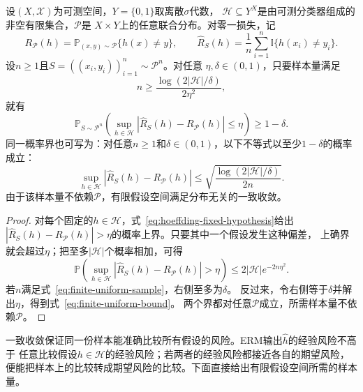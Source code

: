 \begin{theorem}[有限假设空间的一致收敛样本量界]
\label{thm:finite-uniform-convergence}
设$(X,\mathcal X)$为可测空间，$Y=\{0,1\}$取离散$\sigma$代数，
$\mathcal H\subseteq Y^X$是由可测分类器组成的非空有限集合，$\mathcal P$是
$X\times Y$上的任意联合分布。对零一损失，记
\[
 R_{\mathcal P}(h)=\mathbb P_{(x,y)\sim\mathcal P}\{h(x)\neq y\},\qquad
 \hat R_S(h)=\frac1n\sum_{i=1}^n\mathbb I\{h(x_i)\neq y_i\}.
\]
设$n\geq1$且$S=((x_i,y_i))_{i=1}^n\sim\mathcal P^n$。对任意
$\eta,\delta\in(0,1)$，只要样本量满足
\begin{equation}
 n\geq\frac{\log(2|\mathcal H|/\delta)}{2\eta^2},
 \label{eq:finite-uniform-sample}
\end{equation}
就有
\[
 \mathbb P_{S\sim\mathcal P^n}\left(
 \sup_{h\in\mathcal H}|\hat R_S(h)-R_{\mathcal P}(h)|\leq\eta
 \right)\geq1-\delta.
\]
同一概率界也可写为：对任意$n\geq1$和$\delta\in(0,1)$，以下不等式以至少$1-\delta$的概率成立：
\begin{equation}
 \sup_{h\in\mathcal H}|\hat R_S(h)-R_{\mathcal P}(h)|
 \leq\sqrt{\frac{\log(2|\mathcal H|/\delta)}{2n}}.
 \label{eq:finite-uniform-bound}
\end{equation}
由于该样本量不依赖$\mathcal P$，有限假设空间满足分布无关的一致收敛。
\end{theorem}

\begin{proof}
对每个固定的$h\in\mathcal H$，式~\eqref{eq:hoeffding-fixed-hypothesis}给出
$|\hat R_S(h)-R_{\mathcal P}(h)|>\eta$的概率上界。只要其中一个假设发生这种偏差，
上确界就会超过$\eta$；把至多$|\mathcal H|$个概率相加，可得
\[
 \mathbb P\left(\sup_{h\in\mathcal H}|\hat R_S(h)-R_{\mathcal P}(h)|>\eta\right)
 \leq 2|\mathcal H|e^{-2n\eta^2}.
\]
若$n$满足式~\eqref{eq:finite-uniform-sample}，右侧至多为$\delta$。
反过来，令右侧等于$\delta$并解出$\eta$，得到式~\eqref{eq:finite-uniform-bound}。
两个界都对任意$\mathcal P$成立，所需样本量不依赖$\mathcal P$。
\end{proof}

一致收敛保证同一份样本能准确比较所有假设的风险。ERM输出$\hat h$的经验风险不高于
任意比较假设$h\in\mathcal H$的经验风险；若两者的经验风险都接近各自的期望风险，
便能把样本上的比较转成期望风险的比较。下面直接给出有限假设空间所需的样本量。

